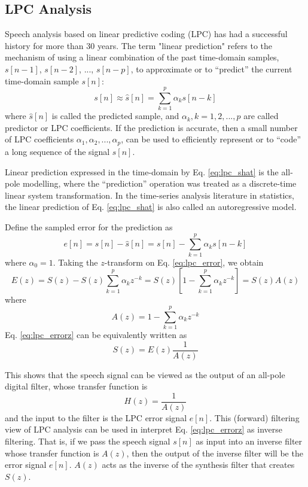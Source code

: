 \documentclass[12pt, a4paper, twoside]{report}
\begin{document}
\subsection{LPC Analysis}
Speech analysis based on linear predictive coding (LPC) has had a successful history for more than 30 years. The term "linear prediction" refers to the mechanism of using a linear combination of the past time-domain samples, $s[n-1]$, $s[n-2]$, ..., $s[n-p]$, to approximate or to ``predict'' the current time-domain sample $s[n]$:
\begin{equation} \label{eq:lpc_shat}
s[n]\approx \hat{s}[n] = \sum_{k=1}^{p}\alpha_k s[n-k]
\end{equation}
where $\hat{s}[n]$ is called the predicted sample, and $\alpha_k, k = 1,2,...,p$ are called predictor or LPC coefficients. If the prediction is accurate, then a small number of LPC coefficients $\alpha_1, \alpha_2, ..., \alpha_p$, can be used to efficiently represent or to ``code'' a long sequence of the signal $s[n]$. 

Linear prediction expressed in the time-domain by Eq. \ref{eq:lpc_shat} is the all-pole modelling, where the ``prediction'' operation was treated as a discrete-time linear system transformation. In the time-series analysis literature in statistics, the linear prediction of Eq. \ref{eq:lpc_shat} is also called an autoregressive model.

Define the sampled error for the prediction as
\begin{equation} \label{eq:lpc_error}
e[n] = s[n]-\hat{s}[n] = s[n] - \sum_{k=1}^{p}\alpha_k s[n-k]
\end{equation}
where $\alpha_0 = 1$. Taking the $z$-transform on Eq. \ref{eq:lpc_error}, we obtain
\begin{equation} \label{eq:lpc_errorz}
E(z) = S(z) - S(z) \sum_{k=1}^{p} \alpha_k z^{-k} = S(z)\left [ 1 -\sum_{k=1}^{p} \alpha_k z^{-k} \right ] = S(z) A(z)
\end{equation}
where
\begin{equation} \label{eq:lpc_az}
A(z) = 1 - \sum_{k=1}^{p} \alpha_k z^{-k}
\end{equation}
Eq. \ref{eq:lpc_errorz} can be equivalently written as
\begin{equation} \label{eq:lpc_sz}
S(z) = E(z) \frac{1}{A(z)}
\end{equation}

This shows that the speech signal can be viewed as the output of an all-pole digital filter, whose transfer function is
\begin{equation} \label{eq:lpc_filter_tf}
H(z) = \frac{1}{A(z)}
\end{equation}
and the input to the filter is the LPC error signal $e[n]$. This (forward) filtering view of LPC analysis can be used in interpret Eq. \ref{eq:lpc_errorz} as inverse filtering. That is, if we pass the speech signal $s[n]$ as input into an inverse filter whose transfer function is $A(z)$, then the output of the inverse filter will be the error signal $e[n]$. $A(z)$ acts as the inverse of the synthesis filter that creates $S(z)$.
\end{document}
